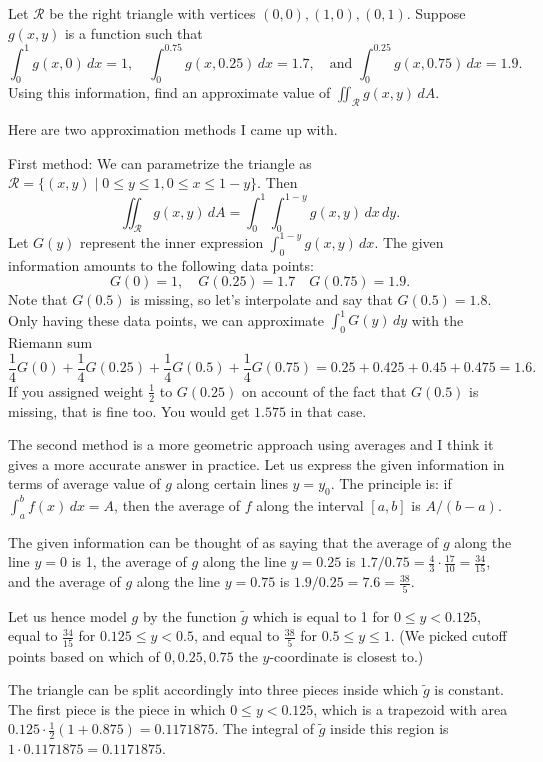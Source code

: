 \begin{problem}
  Let $\mathcal R$ be the right triangle with vertices $(0,0),(1,0),(0,1)$. Suppose $g(x,y)$ is a function such that
  \[\int_0^1 g(x,0)\,dx=1,\quad \int_0^{0.75}g(x,0.25)\,dx=1.7,\quad\text{and }\int_0^{0.25}g(x,0.75)\,dx=1.9.\]
  Using this information, find an approximate value of $\iint_{\mathcal R}g(x,y)\,dA$.
\end{problem}
\begin{solution}
  Here are two approximation methods I came up with.

  First method: We can parametrize the triangle as $\mathcal R=\{(x,y)\mid 0\leq y\leq 1,0\leq x\leq 1-y\}$. Then
  \[\iint_{\mathcal R}g(x,y)\,dA=\int_0^1\int_0^{1-y}g(x,y)\,dx\,dy.\]
  Let $G(y)$ represent the inner expression $\int_0^{1-y}g(x,y)\,dx$. The given information amounts to the following data points:
  \[G(0)=1,\quad G(0.25)=1.7\quad G(0.75)=1.9.\]
  Note that $G(0.5)$ is missing, so let's interpolate and say that $G(0.5)=1.8$. Only having these data points, we can approximate $\int_0^1 G(y)\,dy$ with the Riemann sum
  \[\frac14G(0)+\frac14 G(0.25)+\frac14G(0.5)+\frac14G(0.75)=0.25+0.425+0.45+0.475=1.6.\]
  If you assigned weight $\frac12$ to $G(0.25)$ on account of the fact that $G(0.5)$ is missing, that is fine too. You would get $1.575$ in that case.

  The second method is a more geometric approach using averages and I think it gives a more accurate answer in practice. Let us express the given information in terms of average value of $g$ along certain lines $y=y_0$. The principle is: if $\int_a^b f(x)\,dx=A$, then the average of $f$ along the interval $[a,b]$ is $A/(b-a)$.

  The given information can be thought of as saying that the average of $g$ along the line $y=0$ is 1, the average of $g$ along the line $y=0.25$ is $1.7/0.75=\frac43\cdot\frac{17}{10}=\frac{34}{15}$, and the average of $g$ along the line $y=0.75$ is $1.9/0.25=7.6=\frac{38}{5}$.

  Let us hence model $g$ by the function $\widetilde g$ which is equal to 1 for $0\leq y< 0.125$, equal to $\frac{34}{15}$ for $0.125\leq y<0.5$, and equal to $\frac{38}5$ for $0.5\leq y\leq 1$. (We picked cutoff points based on which of $0,0.25,0.75$ the $y$-coordinate is closest to.)

  The triangle can be split accordingly into three pieces inside which $\widetilde g$ is constant. The first piece is the piece in which $0\leq y<0.125$, which is a trapezoid with area $0.125\cdot \frac12(1+0.875)=0.1171875$. The integral of $\widetilde g$ inside this region is $1\cdot 0.1171875=0.1171875$.


\end{solution}
